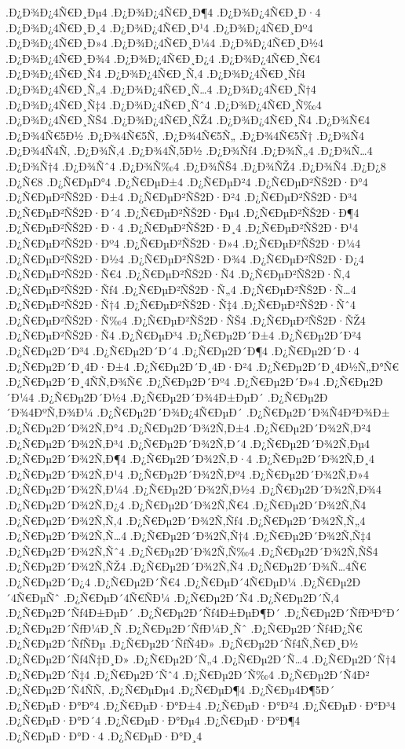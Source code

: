 {.Ð¿Ð¾Ð¿4Ñ€Ð¸Ðµ4
.Ð¿Ð¾Ð¿4Ñ€Ð¸Ð¶4
.Ð¿Ð¾Ð¿4Ñ€Ð¸Ð·4
.Ð¿Ð¾Ð¿4Ñ€Ð¸Ð¸4
.Ð¿Ð¾Ð¿4Ñ€Ð¸Ð¹4
.Ð¿Ð¾Ð¿4Ñ€Ð¸Ðº4
.Ð¿Ð¾Ð¿4Ñ€Ð¸Ð»4
.Ð¿Ð¾Ð¿4Ñ€Ð¸Ð¼4
.Ð¿Ð¾Ð¿4Ñ€Ð¸Ð½4
.Ð¿Ð¾Ð¿4Ñ€Ð¸Ð¾4
.Ð¿Ð¾Ð¿4Ñ€Ð¸Ð¿4
.Ð¿Ð¾Ð¿4Ñ€Ð¸Ñ€4
.Ð¿Ð¾Ð¿4Ñ€Ð¸Ñ4
.Ð¿Ð¾Ð¿4Ñ€Ð¸Ñ‚4
.Ð¿Ð¾Ð¿4Ñ€Ð¸Ñƒ4
.Ð¿Ð¾Ð¿4Ñ€Ð¸Ñ„4
.Ð¿Ð¾Ð¿4Ñ€Ð¸Ñ…4
.Ð¿Ð¾Ð¿4Ñ€Ð¸Ñ†4
.Ð¿Ð¾Ð¿4Ñ€Ð¸Ñ‡4
.Ð¿Ð¾Ð¿4Ñ€Ð¸Ñˆ4
.Ð¿Ð¾Ð¿4Ñ€Ð¸Ñ‰4
.Ð¿Ð¾Ð¿4Ñ€Ð¸ÑŠ4
.Ð¿Ð¾Ð¿4Ñ€Ð¸ÑŽ4
.Ð¿Ð¾Ð¿4Ñ€Ð¸Ñ4
.Ð¿Ð¾Ñ€4
.Ð¿Ð¾4Ñ€5Ð½
.Ð¿Ð¾4Ñ€5Ñ‚
.Ð¿Ð¾4Ñ€5Ñ„
.Ð¿Ð¾4Ñ€5Ñ†
.Ð¿Ð¾Ñ4
.Ð¿Ð¾4Ñ4Ñ‚
.Ð¿Ð¾Ñ‚4
.Ð¿Ð¾4Ñ‚5Ð½
.Ð¿Ð¾Ñƒ4
.Ð¿Ð¾Ñ„4
.Ð¿Ð¾Ñ…4
.Ð¿Ð¾Ñ†4
.Ð¿Ð¾Ñˆ4
.Ð¿Ð¾Ñ‰4
.Ð¿Ð¾ÑŠ4
.Ð¿Ð¾ÑŽ4
.Ð¿Ð¾Ñ4
.Ð¿Ð¿8
.Ð¿Ñ€8
.Ð¿Ñ€ÐµÐ°4
.Ð¿Ñ€ÐµÐ±4
.Ð¿Ñ€ÐµÐ²4
.Ð¿Ñ€ÐµÐ²ÑŠ2Ð·Ð°4
.Ð¿Ñ€ÐµÐ²ÑŠ2Ð·Ð±4
.Ð¿Ñ€ÐµÐ²ÑŠ2Ð·Ð²4
.Ð¿Ñ€ÐµÐ²ÑŠ2Ð·Ð³4
.Ð¿Ñ€ÐµÐ²ÑŠ2Ð·Ð´4
.Ð¿Ñ€ÐµÐ²ÑŠ2Ð·Ðµ4
.Ð¿Ñ€ÐµÐ²ÑŠ2Ð·Ð¶4
.Ð¿Ñ€ÐµÐ²ÑŠ2Ð·Ð·4
.Ð¿Ñ€ÐµÐ²ÑŠ2Ð·Ð¸4
.Ð¿Ñ€ÐµÐ²ÑŠ2Ð·Ð¹4
.Ð¿Ñ€ÐµÐ²ÑŠ2Ð·Ðº4
.Ð¿Ñ€ÐµÐ²ÑŠ2Ð·Ð»4
.Ð¿Ñ€ÐµÐ²ÑŠ2Ð·Ð¼4
.Ð¿Ñ€ÐµÐ²ÑŠ2Ð·Ð½4
.Ð¿Ñ€ÐµÐ²ÑŠ2Ð·Ð¾4
.Ð¿Ñ€ÐµÐ²ÑŠ2Ð·Ð¿4
.Ð¿Ñ€ÐµÐ²ÑŠ2Ð·Ñ€4
.Ð¿Ñ€ÐµÐ²ÑŠ2Ð·Ñ4
.Ð¿Ñ€ÐµÐ²ÑŠ2Ð·Ñ‚4
.Ð¿Ñ€ÐµÐ²ÑŠ2Ð·Ñƒ4
.Ð¿Ñ€ÐµÐ²ÑŠ2Ð·Ñ„4
.Ð¿Ñ€ÐµÐ²ÑŠ2Ð·Ñ…4
.Ð¿Ñ€ÐµÐ²ÑŠ2Ð·Ñ†4
.Ð¿Ñ€ÐµÐ²ÑŠ2Ð·Ñ‡4
.Ð¿Ñ€ÐµÐ²ÑŠ2Ð·Ñˆ4
.Ð¿Ñ€ÐµÐ²ÑŠ2Ð·Ñ‰4
.Ð¿Ñ€ÐµÐ²ÑŠ2Ð·ÑŠ4
.Ð¿Ñ€ÐµÐ²ÑŠ2Ð·ÑŽ4
.Ð¿Ñ€ÐµÐ²ÑŠ2Ð·Ñ4
.Ð¿Ñ€ÐµÐ³4
.Ð¿Ñ€Ðµ2Ð´Ð±4
.Ð¿Ñ€Ðµ2Ð´Ð²4
.Ð¿Ñ€Ðµ2Ð´Ð³4
.Ð¿Ñ€Ðµ2Ð´Ð´4
.Ð¿Ñ€Ðµ2Ð´Ð¶4
.Ð¿Ñ€Ðµ2Ð´Ð·4
.Ð¿Ñ€Ðµ2Ð´Ð¸4Ð·Ð±4
.Ð¿Ñ€Ðµ2Ð´Ð¸4Ð·Ð²4
.Ð¿Ñ€Ðµ2Ð´Ð¸4Ð½Ñ„Ð°Ñ€
.Ð¿Ñ€Ðµ2Ð´Ð¸4ÑÑ‚Ð¾Ñ€
.Ð¿Ñ€Ðµ2Ð´Ðº4
.Ð¿Ñ€Ðµ2Ð´Ð»4
.Ð¿Ñ€Ðµ2Ð´Ð¼4
.Ð¿Ñ€Ðµ2Ð´Ð½4
.Ð¿Ñ€Ðµ2Ð´Ð¾4Ð±ÐµÐ´
.Ð¿Ñ€Ðµ2Ð´Ð¾4ÐºÑ‚Ð¾Ð¼
.Ð¿Ñ€Ðµ2Ð´Ð¾Ð¿4Ñ€ÐµÐ´
.Ð¿Ñ€Ðµ2Ð´Ð¾Ñ4Ð²Ð¾Ð±
.Ð¿Ñ€Ðµ2Ð´Ð¾2Ñ‚Ð°4
.Ð¿Ñ€Ðµ2Ð´Ð¾2Ñ‚Ð±4
.Ð¿Ñ€Ðµ2Ð´Ð¾2Ñ‚Ð²4
.Ð¿Ñ€Ðµ2Ð´Ð¾2Ñ‚Ð³4
.Ð¿Ñ€Ðµ2Ð´Ð¾2Ñ‚Ð´4
.Ð¿Ñ€Ðµ2Ð´Ð¾2Ñ‚Ðµ4
.Ð¿Ñ€Ðµ2Ð´Ð¾2Ñ‚Ð¶4
.Ð¿Ñ€Ðµ2Ð´Ð¾2Ñ‚Ð·4
.Ð¿Ñ€Ðµ2Ð´Ð¾2Ñ‚Ð¸4
.Ð¿Ñ€Ðµ2Ð´Ð¾2Ñ‚Ð¹4
.Ð¿Ñ€Ðµ2Ð´Ð¾2Ñ‚Ðº4
.Ð¿Ñ€Ðµ2Ð´Ð¾2Ñ‚Ð»4
.Ð¿Ñ€Ðµ2Ð´Ð¾2Ñ‚Ð¼4
.Ð¿Ñ€Ðµ2Ð´Ð¾2Ñ‚Ð½4
.Ð¿Ñ€Ðµ2Ð´Ð¾2Ñ‚Ð¾4
.Ð¿Ñ€Ðµ2Ð´Ð¾2Ñ‚Ð¿4
.Ð¿Ñ€Ðµ2Ð´Ð¾2Ñ‚Ñ€4
.Ð¿Ñ€Ðµ2Ð´Ð¾2Ñ‚Ñ4
.Ð¿Ñ€Ðµ2Ð´Ð¾2Ñ‚Ñ‚4
.Ð¿Ñ€Ðµ2Ð´Ð¾2Ñ‚Ñƒ4
.Ð¿Ñ€Ðµ2Ð´Ð¾2Ñ‚Ñ„4
.Ð¿Ñ€Ðµ2Ð´Ð¾2Ñ‚Ñ…4
.Ð¿Ñ€Ðµ2Ð´Ð¾2Ñ‚Ñ†4
.Ð¿Ñ€Ðµ2Ð´Ð¾2Ñ‚Ñ‡4
.Ð¿Ñ€Ðµ2Ð´Ð¾2Ñ‚Ñˆ4
.Ð¿Ñ€Ðµ2Ð´Ð¾2Ñ‚Ñ‰4
.Ð¿Ñ€Ðµ2Ð´Ð¾2Ñ‚ÑŠ4
.Ð¿Ñ€Ðµ2Ð´Ð¾2Ñ‚ÑŽ4
.Ð¿Ñ€Ðµ2Ð´Ð¾2Ñ‚Ñ4
.Ð¿Ñ€Ðµ2Ð´Ð¾Ñ…4Ñ€
.Ð¿Ñ€Ðµ2Ð´Ð¿4
.Ð¿Ñ€Ðµ2Ð´Ñ€4
.Ð¿Ñ€ÐµÐ´4Ñ€ÐµÐ¼
.Ð¿Ñ€Ðµ2Ð´4Ñ€ÐµÑˆ
.Ð¿Ñ€ÐµÐ´4Ñ€ÑÐ¼
.Ð¿Ñ€Ðµ2Ð´Ñ4
.Ð¿Ñ€Ðµ2Ð´Ñ‚4
.Ð¿Ñ€Ðµ2Ð´Ñƒ4Ð±ÐµÐ´
.Ð¿Ñ€Ðµ2Ð´Ñƒ4Ð±ÐµÐ¶Ð´
.Ð¿Ñ€Ðµ2Ð´ÑƒÐ³Ð°Ð´
.Ð¿Ñ€Ðµ2Ð´ÑƒÐ¼Ð¸Ñ
.Ð¿Ñ€Ðµ2Ð´ÑƒÐ¼Ð¸Ñˆ
.Ð¿Ñ€Ðµ2Ð´Ñƒ4Ð¿Ñ€
.Ð¿Ñ€Ðµ2Ð´ÑƒÑÐµ
.Ð¿Ñ€Ðµ2Ð´ÑƒÑ4Ð»
.Ð¿Ñ€Ðµ2Ð´Ñƒ4Ñ‚Ñ€Ð¸Ð½
.Ð¿Ñ€Ðµ2Ð´Ñƒ4Ñ‡Ð¸Ð»
.Ð¿Ñ€Ðµ2Ð´Ñ„4
.Ð¿Ñ€Ðµ2Ð´Ñ…4
.Ð¿Ñ€Ðµ2Ð´Ñ†4
.Ð¿Ñ€Ðµ2Ð´Ñ‡4
.Ð¿Ñ€Ðµ2Ð´Ñˆ4
.Ð¿Ñ€Ðµ2Ð´Ñ‰4
.Ð¿Ñ€Ðµ2Ð´Ñ4Ð²
.Ð¿Ñ€Ðµ2Ð´Ñ4ÑÑ‚
.Ð¿Ñ€ÐµÐµ4
.Ð¿Ñ€ÐµÐ¶4
.Ð¿Ñ€Ðµ4Ð¶5Ð´
.Ð¿Ñ€ÐµÐ·Ð°Ð°4
.Ð¿Ñ€ÐµÐ·Ð°Ð±4
.Ð¿Ñ€ÐµÐ·Ð°Ð²4
.Ð¿Ñ€ÐµÐ·Ð°Ð³4
.Ð¿Ñ€ÐµÐ·Ð°Ð´4
.Ð¿Ñ€ÐµÐ·Ð°Ðµ4
.Ð¿Ñ€ÐµÐ·Ð°Ð¶4
.Ð¿Ñ€ÐµÐ·Ð°Ð·4
.Ð¿Ñ€ÐµÐ·Ð°Ð¸4
}

